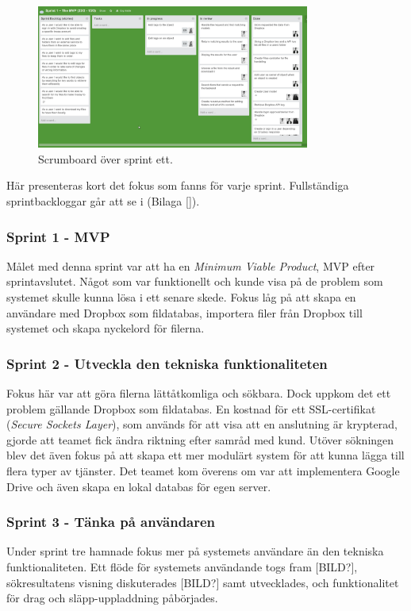 \begin{figure}[!H]
\centering
\includegraphics[width=0.8\textwidth]{figures/trello.png}
\caption{Scrumboard över sprint ett.}
\label{fig:trello}
\end{figure}

Här presenteras kort det fokus som fanns för varje sprint. Fullständiga sprintbackloggar går att se i (Bilaga []).

\subsubsection{Sprint 1 - MVP}
Målet med denna sprint var att ha en \textit{Minimum Viable Product}, MVP\cite{mvp} efter sprintavslutet. Något som var funktionellt och kunde visa på de problem som systemet skulle kunna lösa i ett senare skede. Fokus låg på att skapa en användare med Dropbox som fildatabas, importera filer från Dropbox till systemet och skapa nyckelord för filerna.

\subsubsection{Sprint 2 - Utveckla den tekniska funktionaliteten}
Fokus här var att göra filerna lättåtkomliga och sökbara. Dock uppkom det ett problem gällande Dropbox som fildatabas. En kostnad för ett SSL-certifikat (\textit{Secure Sockets Layer}), som används för att visa att en anslutning är krypterad, gjorde att teamet fick ändra riktning efter samråd med kund. Utöver sökningen blev det även fokus på att skapa ett mer modulärt system för att kunna lägga till flera typer av tjänster. Det teamet kom överens om var att implementera Google Drive och även skapa en lokal databas för egen server. 

\subsubsection{Sprint 3 - Tänka på användaren}
Under sprint tre hamnade fokus mer på systemets användare än den tekniska funktionaliteten. Ett flöde för systemets användande togs fram [BILD?], sökresultatens visning diskuterades [BILD?] samt utvecklades, och funktionalitet för drag och släpp-uppladdning påbörjades.

